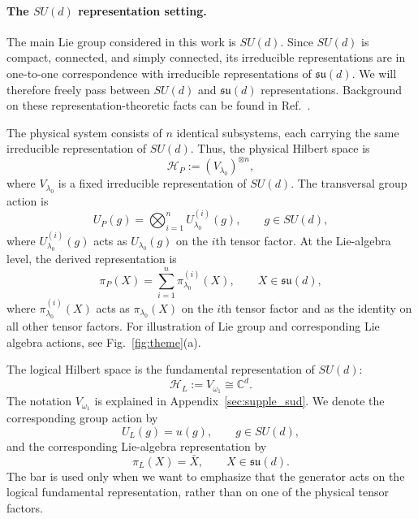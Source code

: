 \documentclass[10pt,twocolumn,superscriptaddress,aps,amsmath,amssymb,citeautoscript,floatfix,prx]{revtex4-2}
\newcounter{alg}
\theoremstyle{plain}
\theoremstyle{plain}
\theoremstyle{plain}
\theoremstyle{plain}
\theoremstyle{plain}
\theoremstyle{plain}
\theoremstyle{plain}
\theoremstyle{definition}
\theoremstyle{plain}
\begin{document}
\paragraph{The $SU(d)$ representation setting.}

The main Lie group considered in this work is $SU(d)$. Since $SU(d)$ is compact, connected, and simply connected, 
its irreducible representations are in one-to-one correspondence with irreducible representations of $\mathfrak{su}(d)$. 
We will therefore freely pass between $SU(d)$ and $\mathfrak{su}(d)$ representations. 
Background on these representation-theoretic facts can be found in Ref.~\cite{Hall2015}.

The physical system consists of $n$ identical subsystems, each carrying the same irreducible representation of $SU(d)$. 
Thus, the physical Hilbert space is
\begin{equation}\label{eq:phys_space_rep}
\mathcal H_P
:=
(V_{\lambda_0})^{\otimes n},
\end{equation}
where $V_{\lambda_0}$ is a fixed irreducible representation of $SU(d)$. The transversal group action is
\begin{equation}\label{eq:group_phys_space_rep}
U_P(g)
=
\bigotimes_{i=1}^n
U_{\lambda_0}^{(i)}(g),
\qquad
g\in SU(d),
\end{equation}
where $U_{\lambda_0}^{(i)}(g)$ acts as $U_{\lambda_0}(g)$ on the $i$th tensor factor. At the Lie-algebra level, the derived representation is
\begin{equation}\label{eq:alg_phys_space_rep}
\pi_P(X)
=
\sum_{i=1}^n
\pi_{\lambda_0}^{(i)}(X),
\qquad
X\in\mathfrak{su}(d),
\end{equation}
where $\pi_{\lambda_0}^{(i)}(X)$ acts as $\pi_{\lambda_0}(X)$ on the $i$th tensor factor and as the identity on all other tensor factors. 
For illustration of Lie group and corresponding Lie algebra actions, see Fig.~\ref{fig:theme}(a).

The logical Hilbert space is the fundamental representation of $SU(d)$:
\begin{equation}\label{eq:log_space_rep}
\mathcal H_L
:=
V_{\omega_1}
\cong
\mathbb C^d .
\end{equation}
The notation $V_{\omega_1}$ is explained in Appendix~\ref{sec:supple_sud}. We denote the corresponding group action by
$$
U_L(g)
=
u(g),
\qquad
g\in SU(d),
$$
and the corresponding Lie-algebra representation by
$$
\pi_L(X)
=
\bar X,
\qquad
X\in\mathfrak{su}(d).
$$
The bar is used only when we want to emphasize that the generator acts on the logical fundamental representation, 
rather than on one of the physical tensor factors.
\end{document}
